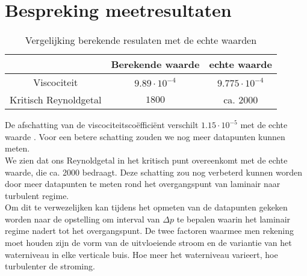\section{Bespreking meetresultaten}

\begin{table}[H]
    \centering
    \label{tab:vergelijking}
    \caption{Vergelijking berekende resulaten met de echte waarden}
    \begin{tabular}{| c | c | c |}
        \hline
                                & Berekende waarde      & echte waarde          \\ \hline
        Viscociteit             & $9.89 \cdot 10^{-4}$  & $9.775 \cdot 10^{-4}$ \\ \hline
        Kritisch Reynoldgetal   & $1800$                & ca. $2000$            \\ \hline
    \end{tabular}
\end{table}

De afschatting van de viscociteitsco\"effici\"ent verschilt $1.15 \cdot 10^{-5}$ met de echte waarde \cite{viscocity}.
Voor een betere schatting zouden we nog meer datapunten kunnen meten.
\\

We zien dat ons Reynoldgetal in het kritisch punt overeenkomt met de echte waarde, die ca. 2000 bedraagt. 
Deze schatting zou nog verbeterd kunnen worden door meer datapunten te meten rond het overgangspunt van 
laminair naar turbulent regime. \\

Om dit te verwezelijken kan tijdens het opmeten van de datapunten gekeken worden naar de opstelling om 
interval van $\Delta p$ te bepalen waarin het laminair regime nadert tot het overgangspunt. De twee factoren waarmee 
men rekening moet houden zijn de vorm van de uitvloeiende stroom en de variantie van het waterniveau in elke verticale buis.
Hoe meer het waterniveau varieert, hoe turbulenter de stroming.
